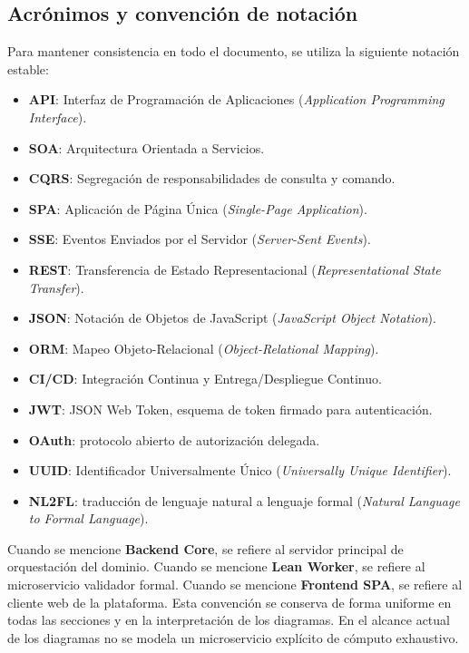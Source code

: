\documentclass[12pt, letterpaper]{article}
\begin{document}
\subsection{Acrónimos y convención de notación}

Para mantener consistencia en todo el documento, se utiliza la siguiente notación estable:
\begin{itemize}
    \item \textbf{API}: Interfaz de Programación de Aplicaciones (\textit{Application Programming Interface}).
    \item \textbf{SOA}: Arquitectura Orientada a Servicios.
    \item \textbf{CQRS}: Segregación de responsabilidades de consulta y comando.
    \item \textbf{SPA}: Aplicación de Página Única (\textit{Single-Page Application}).
    \item \textbf{SSE}: Eventos Enviados por el Servidor (\textit{Server-Sent Events}).
    \item \textbf{REST}: Transferencia de Estado Representacional (\textit{Representational State Transfer}).
    \item \textbf{JSON}: Notación de Objetos de JavaScript (\textit{JavaScript Object Notation}).
    \item \textbf{ORM}: Mapeo Objeto-Relacional (\textit{Object-Relational Mapping}).
    \item \textbf{CI/CD}: Integración Continua y Entrega/Despliegue Continuo.
    \item \textbf{JWT}: JSON Web Token, esquema de token firmado para autenticación.
    \item \textbf{OAuth}: protocolo abierto de autorización delegada.
    \item \textbf{UUID}: Identificador Universalmente Único (\textit{Universally Unique Identifier}).
    \item \textbf{NL2FL}: traducción de lenguaje natural a lenguaje formal (\textit{Natural Language to Formal Language}).
\end{itemize}

Cuando se mencione \textbf{Backend Core}, se refiere al servidor principal de orquestación del dominio. Cuando se mencione \textbf{Lean Worker}, se refiere al microservicio validador formal. Cuando se mencione \textbf{Frontend SPA}, se refiere al cliente web de la plataforma. Esta convención se conserva de forma uniforme en todas las secciones y en la interpretación de los diagramas. En el alcance actual de los diagramas no se modela un microservicio explícito de cómputo exhaustivo.
\end{document}
